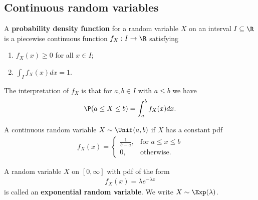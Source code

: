 \documentclass{article}
\begin{document}
\subsection{Continuous random variables}
\begin{definition}
	A \textbf{probability density function} for a random variable $X$ on an
	interval $I\subseteq\R$ is a piecewise continuous function $f_X:I\to\R$ satisfying
	\begin{enumerate}
		\item $f_X(x) \geq 0$ for all $x\in I$;
		\item $\int_I f_X(x) dx =1$.
	\end{enumerate}
	The interpretation of $f_X$ is that for $a,b\in I$ with $a\leq b$ we have
	\begin{align*}
		\P(a\leq X\leq b)=\int_a^b f_X(x)dx.
	\end{align*}
\end{definition}
\begin{definition}
	A continuous random variable $X\sim\Unif(a,b)$ if $X$ has a constant pdf
	\begin{align*}
		f_X(x) = \begin{cases}
			\frac{1}{b-a}, & \text{for }a\leq x\leq b \\
			0,             & \text{otherwise.}
		\end{cases}
	\end{align*}
\end{definition}
\begin{definition}
	A random variable $X$ on $[0,\infty]$ with pdf of the form
	\begin{align*}
		f_X(x) = \lambda e^{-\lambda x}
	\end{align*}
	is called an \textbf{exponential random variable}.
	We write $X\sim\Exp(\lambda)$.
\end{definition}
\end{document}
